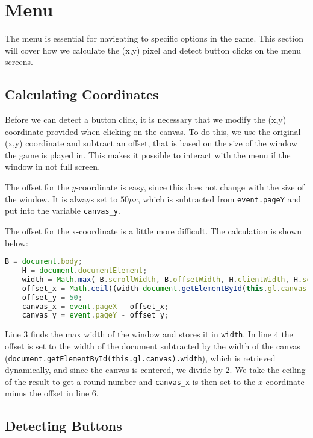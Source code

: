 \section{Menu}
\label{sec:imp_menu}

The menu is essential for navigating to specific options in the game. This section will cover how we calculate the (x,y) pixel and detect button clicks on the menu screens.

\subsection{Calculating Coordinates}

Before we can detect a button click, it is necessary that we modify the (x,y) coordinate provided when clicking on the canvas. To do this, we use the original (x,y) coordinate and subtract an offset, that is based on the size of the window the game is played in. This makes it possible to interact with the menu if the window in not full screen.

The offset for the $y$-coordinate is easy, since this does not change with the size of the window. It is always set to $50px$, which is subtracted from \verb|event.pageY| and put into the variable \verb|canvas_y|.\newline

The offset for the x-coordinate is a little more difficult. The calculation is shown below:

\begin{lstlisting}[language=JavaScript, caption=function: doMouseDown(event)]
	B = document.body;
	H = document.documentElement;
	width = Math.max( B.scrollWidth, B.offsetWidth, H.clientWidth, H.scrollWidth, H.offsetWidth);
	offset_x = Math.ceil((width-document.getElementById(this.gl.canvas).width)/2);
	offset_y = 50;
	canvas_x = event.pageX - offset_x;
	canvas_y = event.pageY - offset_y;
\end{lstlisting}
 
Line $3$ finds the max width of the window and stores it in \verb|width|. In line $4$ the offset is set to the width of the document subtracted by the width of the canvas (\verb|document.getElementById(this.gl.canvas).width|), which is retrieved dynamically, and since the canvas is centered, we divide by 2. We take the ceiling of the result to get a round number and \verb|canvas_x| is then set to the $x$-coordinate minus the offset in line $6$.

\subsection{Detecting Buttons}

